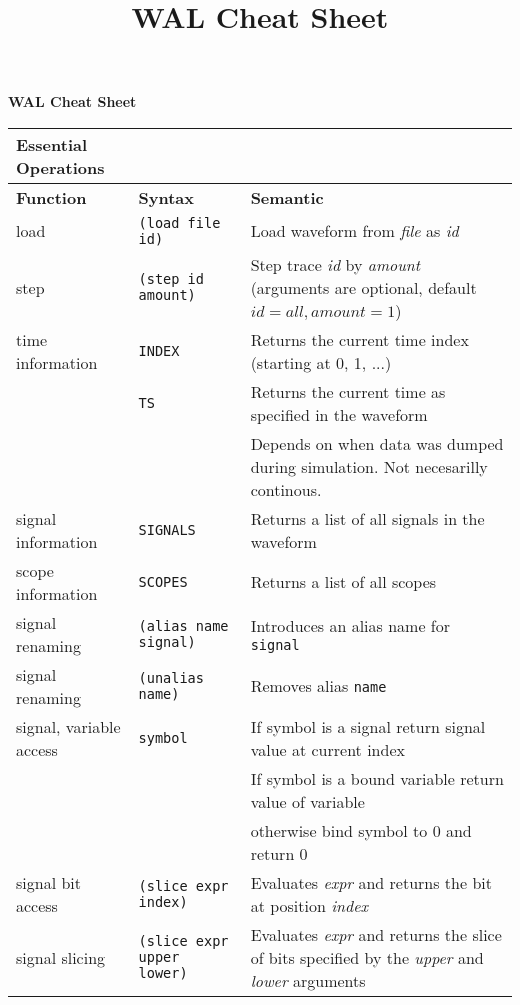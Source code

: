 \documentclass[9pt]{article}
\title{WAL Cheat Sheet}
\begin{document}
\begin{table*}[h]
  \centering
  \begin{center}
    {\bf {\huge WAL Cheat Sheet}}
  \end{center}

  \begin{tabular}{lll}
    \toprule
    {\large {\bf Essential Operations}} & & \\ \toprule
    {\bf Function}                & {\bf Syntax} & {\bf Semantic} \\ \toprule
    load                    & {\tt (load file id)}       & Load waveform from \emph{file} as \emph{id}        \\
    step                    & {\tt (step id amount)} & Step trace \emph{id} by \emph{amount} (arguments are optional, default $id=all,amount=1$)\\
    time information        & {\tt INDEX} & Returns the current time index (starting at 0, 1, ...) \\
                                        & {\tt TS} & Returns the current time as specified in the waveform \\
                                        &            & Depends on when data was dumped during simulation. Not necesarilly continous. \\
    signal information      & {\tt SIGNALS} & Returns a list of all signals in the waveform \\
    scope information       & {\tt SCOPES} & Returns a list of all scopes \\
    signal renaming         & {\tt (alias name signal)} & Introduces an alias name for {\tt signal} \\
    signal renaming         & {\tt (unalias name)} & Removes alias {\tt name} \\
    \midrule
    signal, variable access & {\tt symbol} & If symbol is a signal return signal value at current index \\
                                        &        & If symbol is a bound variable return value of variable    \\
                                        &        & otherwise bind symbol to 0 and return 0                   \\
    signal bit access       & {\tt (slice expr index)} &  Evaluates \emph{expr} and returns the bit at position \emph{index}\\
    signal slicing          & {\tt (slice expr upper lower)} & Evaluates \emph{expr} and returns the slice of bits specified by the \emph{upper} and \emph{lower} arguments\\


\end{tabular}
\end{table*}
\end{document}
